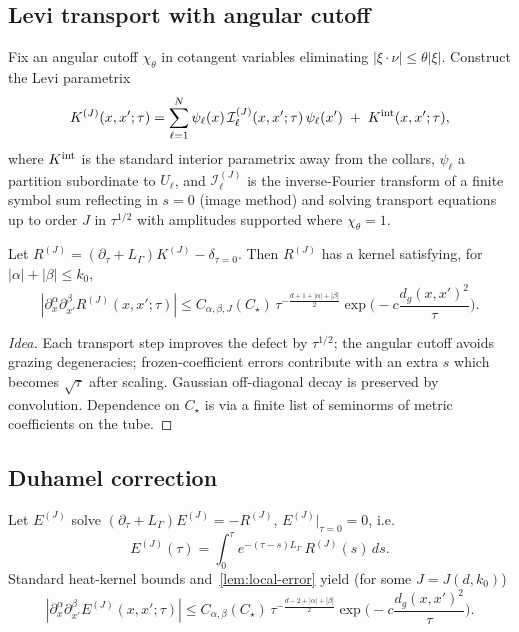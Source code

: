 \subsection{Levi transport with angular cutoff}
Fix an angular cutoff $\chi_\theta$ in cotangent variables eliminating $|\xi\cdot\nu|\le\theta|\xi|$.
Construct the Levi parametrix
\[
K^{(J)}(x,x';\tau)=\sum_{\ell=1}^N \psi_\ell(x)\,\mathcal I^{(J)}_\ell(x,x';\tau)\,\psi_\ell(x')\;+\;K^{\rm int}(x,x';\tau),
\]
where $K^{\rm int}$ is the standard interior parametrix away from the collars, $\psi_\ell$ a partition subordinate to $U_\ell$, and $\mathcal I^{(J)}_\ell$ is the inverse-Fourier transform of a finite symbol sum reflecting in $s=0$ (image method) and solving transport equations up to order $J$ in $\tau^{1/2}$ with amplitudes supported where $\chi_\theta=1$.

\begin{lemma}\label{lem:local-error}
Let $R^{(J)}=(\partial_\tau+L_\Gamma)K^{(J)}-\delta_{\tau=0}$. Then $R^{(J)}$ has a kernel satisfying, for $|\alpha|+|\beta|\le k_0$,
\[
|\partial_x^\alpha\partial_{x'}^\beta R^{(J)}(x,x';\tau)|
\le C_{\alpha,\beta,J}(C_\star)\,\tau^{-\frac{d+1+|\alpha|+|\beta|}{2}}
\exp\!\Big(-c\frac{d_g(x,x')^2}{\tau}\Big).
\]
\end{lemma}

\begin{proof}[Idea]
Each transport step improves the defect by $\tau^{1/2}$; the angular cutoff avoids grazing degeneracies; frozen-coefficient errors contribute with an extra $s$ which becomes $\sqrt{\tau}$ after scaling. Gaussian off-diagonal decay is preserved by convolution. Dependence on $C_\star$ is via a finite list of seminorms of metric coefficients on the tube.
\end{proof}

\subsection{Duhamel correction}
Let $E^{(J)}$ solve $(\partial_\tau+L_\Gamma)E^{(J)}=-R^{(J)}$, $E^{(J)}|_{\tau=0}=0$, i.e.
\[
E^{(J)}(\tau)=\int_0^\tau e^{-(\tau-s)L_\Gamma}\,R^{(J)}(s)\,ds.
\]
Standard heat-kernel bounds and~\ref{lem:local-error} yield (for some $J=J(d,k_0)$)
\begin{equation}\label{eq:remainder-deriv}
|\partial_x^\alpha\partial_{x'}^\beta E^{(J)}(x,x';\tau)|\le
C_{\alpha,\beta}(C_\star)\,\tau^{-\frac{d-2+|\alpha|+|\beta|}{2}}
\exp\!\Big(-c\frac{d_g(x,x')^2}{\tau}\Big).
\end{equation}

